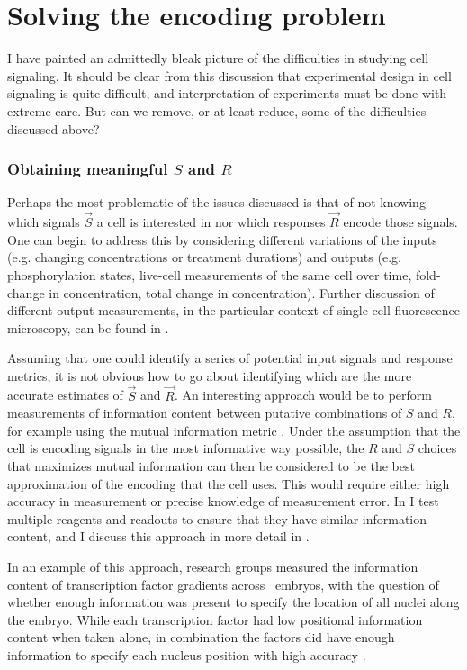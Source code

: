 \section{Solving the encoding problem}
\label{introduction:encodingSolution}

I have painted an admittedly bleak picture of the difficulties in studying
cell signaling. It should be clear from this discussion that experimental
design in cell signaling is quite difficult, and interpretation of experiments
must be done with extreme care. But can we remove, or at least reduce,
some of the difficulties discussed above?


\subsubsection{Obtaining meaningful $S$ and $R$}

Perhaps the most problematic of the issues discussed is that
of not knowing which signals $\vec{S}$ a cell is interested in 
nor which responses $\vec{R}$ encode those signals. One can begin to address
this by considering different variations of the inputs (e.g. changing
concentrations or treatment durations) and outputs
(e.g. phosphorylation states, live-cell measurements of the same
cell over time, fold-change in concentration, total change in concentration).
Further discussion of different output measurements, in the particular
context of single-cell fluorescence microscopy, can
be found in .


Assuming that one could identify a series of potential input signals
and response metrics, it is not obvious how to go about identifying
which are the more accurate estimates of $\vec{S}$ and $\vec{R}$.
An interesting
approach would be to perform measurements of information content
between putative combinations of $S$ and $R$, for example using the
mutual information metric \cite{Cheong2011}.
Under the assumption
that the cell is encoding signals in the most informative way
possible, the $R$ and $S$ choices that maximizes mutual information can then
be considered to be the best approximation
of the encoding that the cell uses. This would require either high
accuracy in measurement or precise knowledge of measurement error. 
In  I test multiple reagents and readouts
to ensure that they have similar information content, and I discuss
this approach in more detail in
.


In an example of this approach, research groups measured the
information content of transcription factor gradients across
\fly\ embryos, with the question of whether enough information
was present to specify the location of all nuclei along the embryo.
While each transcription factor had low positional information content when taken alone,
in combination the factors did have enough information to specify each nucleus
position with high accuracy \cite{Gregor2007,Dubuis2011,Dubuis2013}.


